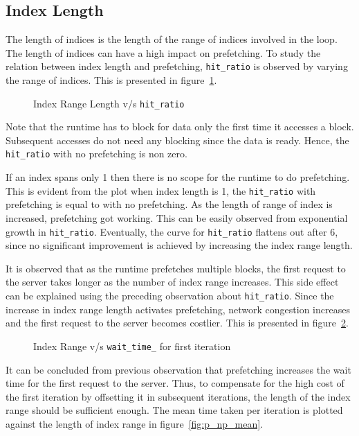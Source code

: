 \subsection{Index Length}
The length of indices is the length of the range of indices involved in the loop.
The length of indices can have a high impact on prefetching. To study the relation
between index length and prefetching, \texttt{hit\_ratio} is observed by varying
the range of indices. This is presented in figure~\ref{fig:hitratio}.
\begin{figure}[h]
  
  \caption{Index Range Length v/s \texttt{hit\_ratio}}
  \label{fig:hitratio}
\end{figure}

Note that the runtime has to block for data only the first time it accesses a block.
Subsequent accesses do not need any blocking since the data is ready. Hence, the
\texttt{hit\_ratio} with no prefetching is non zero.

If an index spans only 1 then there is no scope for the runtime to do prefetching.
This is evident from the plot when index length is 1, the \texttt{hit\_ratio} with
prefetching is equal to with no prefetching. As the length of range of index is increased,
prefetching got working. This can be easily observed from exponential growth in
\texttt{hit\_ratio}. Eventually, the curve for \texttt{hit\_ratio} flattens out
after 6, since no significant improvement is achieved by increasing the index range
length.

It is observed that as the runtime prefetches multiple blocks,
the first request to the server takes longer as the number of index range increases. This
side effect can be explained using the preceding observation about \texttt{hit\_ratio}.
Since the increase in index range length activates prefetching, network congestion
increases and the first request
to the server becomes costlier. This is presented in figure~\ref{fig:p_first_mean}.
\begin{figure}[h]
  
  \caption{Index Range v/s \texttt{wait\_time\_} for first iteration}
  \label{fig:p_first_mean}
\end{figure}

It can be concluded from previous observation that prefetching increases the wait time
for the first request to the server. Thus, to compensate for the high cost of the first
iteration by offsetting it in subsequent iterations, the length of the index range
should be sufficient enough. The mean time taken per iteration is plotted against
the length of index range in figure~\ref{fig:p_np_mean}.

